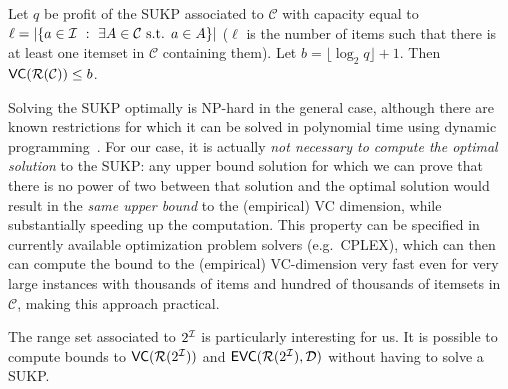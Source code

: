 \begin{corollary}\label{lem:sukpvc}
  Let $q$ be profit of the SUKP associated to $\mathcal{C}$ with capacity
  equal to $\ell=|\{a\in{\cal I} ~:~ \exists A\in\mathcal{C} \mbox{ s.t. } a\in
  A\}|$ ($\ell$ is the number of items such that there is at least one itemset in $\mathcal{C}$ containing
  them).
  Let $b=\lfloor\log_2 q\rfloor + 1$. Then
  $\mathsf{VC}(\mathcal{R}(\mathcal{C}))\le b$. %
\end{corollary}

Solving the SUKP optimally is NP-hard in the general case, although there are known restrictions for
which it can be solved in polynomial time using dynamic
programming~\citep{GoldschmidtNY94}. 
For our case, it is actually \emph{not necessary to compute the optimal
solution} to the SUKP: any upper bound solution for which we can prove that
there is no power of two between that solution and the optimal solution would
result in the \emph{same upper bound} to the (empirical) VC dimension, while
substantially speeding up the computation. This property can be specified in
currently available optimization problem solvers (e.g.~CPLEX), which can then can compute the
bound to the (empirical) VC-dimension very fast even for very large instances
with thousands of items and hundred of thousands of itemsets in $\mathcal{C}$,
making this approach practical. %


The range set associated to $2^{\cal I}$
is particularly interesting for us. It is possible  %
to compute bounds to $\mathsf{VC}(\mathcal{R}(2^{\cal I}))$ and
$\mathsf{EVC}(\mathcal{R}(2^{\cal I}), {\cal D})$ without having to solve a SUKP.

